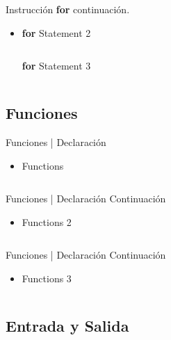 \documentclass[usenames, dvipsnames, compress]{beamer}
\begin{document}
	\begin{frame}[allowframebreaks]{Instrucción \textbf{for} continuación.}
		\begin{itemize}
		\item [] \begin{block}{\textbf{for} Statement 2}
			\inputminted[xleftmargin=\parindent,linenos]{python}{codes/for_statement2.py}
		\end{block}
			\begin{block}{\textbf{for} Statement 3}
			\inputminted[xleftmargin=\parindent,linenos]{python}{codes/for_statement3.py}
		\end{block}
		\end{itemize}
	\end{frame}
\subsection{Funciones}
	\begin{frame}{Funciones | Declaración}
	\begin{itemize}
		\item \begin{block}{Functions}
			\inputminted[xleftmargin=\parindent,linenos]{python}{codes/decl_functions.py}
		\end{block}
	\end{itemize}
	\end{frame}
	\begin{frame}{Funciones | Declaración Continuación}
	\begin{itemize}
		\item [] \begin{block}{Functions 2}
			\inputminted[xleftmargin=\parindent,linenos]{python}{codes/decl_functions2.py}
		\end{block}
	\end{itemize}
	\end{frame}
	\begin{frame}{Funciones | Declaración Continuación}
	\begin{itemize}
		\item [] \begin{block}{Functions 3}
			\inputminted[xleftmargin=\parindent,linenos]{python}{codes/decl_functions3.py}
		\end{block}
	\end{itemize}
	\end{frame}
	\subsection{Entrada y Salida}
	
\end{document}
